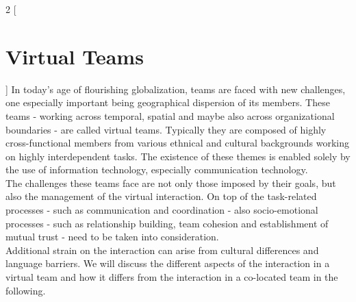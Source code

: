 \begin{multicols}{2}
[\section{Virtual Teams}]
In today's age of flourishing globalization, teams are faced with new challenges, one especially important being geographical dispersion of its members. These teams - working across temporal, spatial and maybe also across organizational boundaries - are called virtual teams. Typically they are composed of highly cross-functional members from various ethnical and cultural backgrounds working on highly interdependent tasks. The existence of these themes is enabled solely by the use of information technology, especially communication technology.\\
The challenges these teams face are not only those imposed by their goals, but also the management of the virtual interaction. On top of the task-related processes - such as communication and coordination - also socio-emotional processes - such as relationship building, team cohesion and establishment of mutual trust - need to be taken into consideration.\\\cite{Powell_Piccoli_Ives_2004} Additional strain on the interaction can arise from cultural differences and language barriers. We will discuss the different aspects of the interaction in a virtual team and how it differs from the interaction in a co-located team in the following.
\end{multicols}